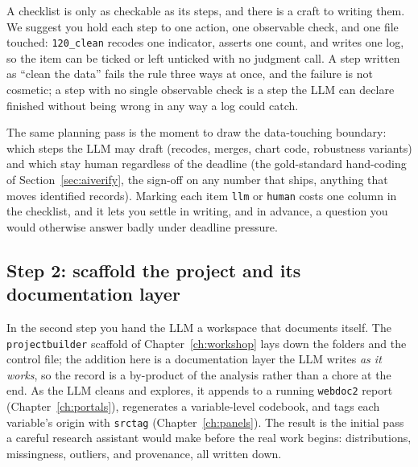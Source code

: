\documentclass[
    a4paper,
    fontsize=10pt,
    twoside=true,
    numbers=noenddot,
]{kaobook}
\begin{document}
A checklist is only as checkable as its steps, and there is a craft to writing them. We suggest you hold each step to one action, one observable check, and one file touched: \texttt{120\_clean} recodes one indicator, asserts one count, and writes one log, so the item can be ticked or left unticked with no judgment call. A step written as \enquote{clean the data} fails the rule three ways at once, and the failure is not cosmetic; a step with no single observable check is a step the LLM can declare finished without being wrong in any way a log could catch.

The same planning pass is the moment to draw the data-touching boundary: which steps the LLM may draft (recodes, merges, chart code, robustness variants) and which stay human regardless of the deadline (the gold-standard hand-coding of Section~\ref{sec:aiverify}, the sign-off on any number that ships, anything that moves identified records). Marking each item \texttt{llm} or \texttt{human} costs one column in the checklist, and it lets you settle in writing, and in advance, a question you would otherwise answer badly under deadline pressure.

\subsection{Step 2: scaffold the project and its documentation layer}
In the second step you hand the LLM a workspace that documents itself. The \texttt{projectbuilder} scaffold of Chapter~\ref{ch:workshop} lays down the folders and the control file; the addition here is a documentation layer the LLM writes \emph{as it works}, so the record is a by-product of the analysis rather than a chore at the end. As the LLM cleans and explores, it appends to a running \texttt{webdoc2} report (Chapter~\ref{ch:portals}), regenerates a variable-level codebook, and tags each variable's origin with \texttt{srctag} (Chapter~\ref{ch:panels}). The result is the initial pass a careful research assistant would make before the real work begins: distributions, missingness, outliers, and provenance, all written down.
\end{document}
